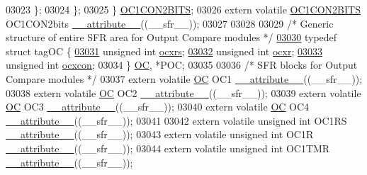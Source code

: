 \begin{DoxyCode}
03023     \};
03024   \};
03025 \} \hyperlink{a00008_db/d3f/a00609}{OC1CON2BITS};
03026 \textcolor{keyword}{extern} \textcolor{keyword}{volatile} \hyperlink{a00008_db/d3f/a00609}{OC1CON2BITS} OC1CON2bits \hyperlink{a00009_a493c46f03454991ccc5aa7a6e1dfb2a7}{\_\_attribute\_\_}((\_\_sfr\_\_));
03027 
03028 
03029 \textcolor{comment}{/* Generic structure of entire SFR area for Output Compare modules */}
\hypertarget{a00009_source_l03030}{}\hyperlink{a00008}{03030} \textcolor{keyword}{typedef} \textcolor{keyword}{struct }tagOC \{
\hypertarget{a00009_source_l03031}{}\hyperlink{a00008_ae0b9ec26b0c1cf6a041e02a5267bb9b3}{03031}         \textcolor{keywordtype}{unsigned} \textcolor{keywordtype}{int} \hyperlink{a00008_ae0b9ec26b0c1cf6a041e02a5267bb9b3}{ocxrs};
\hypertarget{a00009_source_l03032}{}\hyperlink{a00008_ac406e1c79f69cbfc0cbf6c31bffb7bb8}{03032}         \textcolor{keywordtype}{unsigned} \textcolor{keywordtype}{int} \hyperlink{a00008_ac406e1c79f69cbfc0cbf6c31bffb7bb8}{ocxr};
\hypertarget{a00009_source_l03033}{}\hyperlink{a00008_a4e64ca0c8cd27111d8f2a9cb69021129}{03033}         \textcolor{keywordtype}{unsigned} \textcolor{keywordtype}{int} \hyperlink{a00008_a4e64ca0c8cd27111d8f2a9cb69021129}{ocxcon};
03034 \} \hyperlink{a00008_d0/d1c/a00605}{OC}, *POC;
03035 
03036 \textcolor{comment}{/* SFR blocks for Output Compare modules */}
03037 \textcolor{keyword}{extern} \textcolor{keyword}{volatile} \hyperlink{a00008_d0/d1c/a00605}{OC} OC1 \hyperlink{a00009_a493c46f03454991ccc5aa7a6e1dfb2a7}{\_\_attribute\_\_}((\_\_sfr\_\_));
03038 \textcolor{keyword}{extern} \textcolor{keyword}{volatile} \hyperlink{a00008_d0/d1c/a00605}{OC} OC2 \hyperlink{a00009_a493c46f03454991ccc5aa7a6e1dfb2a7}{\_\_attribute\_\_}((\_\_sfr\_\_));
03039 \textcolor{keyword}{extern} \textcolor{keyword}{volatile} \hyperlink{a00008_d0/d1c/a00605}{OC} OC3 \hyperlink{a00009_a493c46f03454991ccc5aa7a6e1dfb2a7}{\_\_attribute\_\_}((\_\_sfr\_\_));
03040 \textcolor{keyword}{extern} \textcolor{keyword}{volatile} \hyperlink{a00008_d0/d1c/a00605}{OC} OC4 \hyperlink{a00009_a493c46f03454991ccc5aa7a6e1dfb2a7}{\_\_attribute\_\_}((\_\_sfr\_\_));
03041 
03042 \textcolor{keyword}{extern} \textcolor{keyword}{volatile} \textcolor{keywordtype}{unsigned} \textcolor{keywordtype}{int}  OC1RS \hyperlink{a00009_a493c46f03454991ccc5aa7a6e1dfb2a7}{\_\_attribute\_\_}((\_\_sfr\_\_));
03043 \textcolor{keyword}{extern} \textcolor{keyword}{volatile} \textcolor{keywordtype}{unsigned} \textcolor{keywordtype}{int}  OC1R \hyperlink{a00009_a493c46f03454991ccc5aa7a6e1dfb2a7}{\_\_attribute\_\_}((\_\_sfr\_\_));
03044 \textcolor{keyword}{extern} \textcolor{keyword}{volatile} \textcolor{keywordtype}{unsigned} \textcolor{keywordtype}{int}  OC1TMR \hyperlink{a00009_a493c46f03454991ccc5aa7a6e1dfb2a7}{\_\_attribute\_\_}((\_\_sfr\_\_));

\end{DoxyCode}
